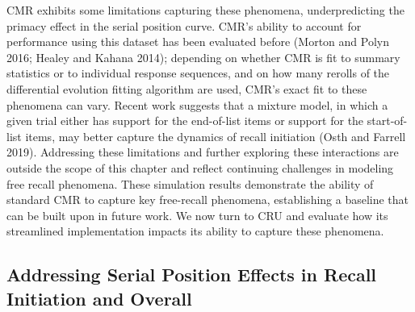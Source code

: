 \documentclass[
  letterpaper,
  11pt,
  english,
  singlespacing,
  headsepline]{MastersDoctoralThesis}
\begin{document}
CMR exhibits some limitations capturing these phenomena, underpredicting
the primacy effect in the serial position curve. CMR's ability to
account for performance using this dataset has been evaluated before
(Morton and Polyn 2016; Healey and Kahana 2014); depending on whether
CMR is fit to summary statistics or to individual response sequences,
and on how many rerolls of the differential evolution fitting algorithm
are used, CMR's exact fit to these phenomena can vary. Recent work
suggests that a mixture model, in which a given trial either has support
for the end-of-list items or support for the start-of-list items, may
better capture the dynamics of recall initiation (Osth and Farrell
2019). Addressing these limitations and further exploring these
interactions are outside the scope of this chapter and reflect
continuing challenges in modeling free recall phenomena. These
simulation results demonstrate the ability of standard CMR to capture
key free-recall phenomena, establishing a baseline that can be built
upon in future work. We now turn to CRU and evaluate how its streamlined
implementation impacts its ability to capture these phenomena.

\subsection{Addressing Serial Position Effects in Recall Initiation and
Overall}\label{addressing-serial-position-effects-in-recall-initiation-and-overall}
\end{document}
